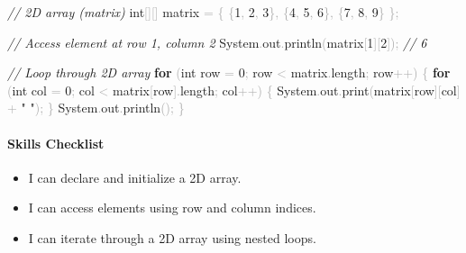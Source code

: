 \documentclass[
  justified,
  openright,
]{tufte-book}
\let\subsection\paragraph
\let\paragraph\paragraph
\newcommand{\KeywordTok}[1]{\textcolor{CodeKeyword}{\textbf{#1}}}  %
\newcommand{\StringTok}[1]{\textcolor{CodeString}{#1}}              %
\newcommand{\CommentTok}[1]{\textcolor{CodeComment}{\textit{#1}}}  %
\newcommand{\CodeNumTok}[1]{\textcolor{CodeNumber}{#1}}             %
\newcommand{\CodeFuncTok}[1]{\textcolor{CodeKeyword}{#1}}           %
\newcommand{\CodeTypeTok}[1]{\textcolor{CodeType}{#1}}              %
\newcommand{\OperatorTok}[1]{\textcolor{DarkGray}{#1}}              %
\newenvironment{Shaded}{%
  \begin{mdframed}[style=TufteCode]%
}{%
  \end{mdframed}%
}
\let\subsection\paragraph
\let\paragraph\paragraph
\providecommand{\tightlist}{%
  \setlength{\itemsep}{0pt}\setlength{\parskip}{0pt}}
\begin{document}
\begin{Shaded}
\begin{Highlighting}[]
\CommentTok{// 2D array (matrix)}
\CodeTypeTok{int}\OperatorTok{[][]} matrix \OperatorTok{=} \OperatorTok{\{}
    \OperatorTok{\{}\CodeNumTok{1}\OperatorTok{,} \CodeNumTok{2}\OperatorTok{,} \CodeNumTok{3}\OperatorTok{\},}
    \OperatorTok{\{}\CodeNumTok{4}\OperatorTok{,} \CodeNumTok{5}\OperatorTok{,} \CodeNumTok{6}\OperatorTok{\},}
    \OperatorTok{\{}\CodeNumTok{7}\OperatorTok{,} \CodeNumTok{8}\OperatorTok{,} \CodeNumTok{9}\OperatorTok{\}}
\OperatorTok{\};}
 
\CommentTok{// Access element at row 1, column 2}
System\OperatorTok{.}\CodeFuncTok{out}\OperatorTok{.}\CodeFuncTok{println}\OperatorTok{(}matrix\OperatorTok{[}\CodeNumTok{1}\OperatorTok{][}\CodeNumTok{2}\OperatorTok{]);}   \CommentTok{// 6}
 
\CommentTok{// Loop through 2D array}
\KeywordTok{for} \OperatorTok{(}\CodeTypeTok{int} row \OperatorTok{=} \CodeNumTok{0}\OperatorTok{;} row \OperatorTok{\textless{}} matrix\OperatorTok{.}\CodeFuncTok{length}\OperatorTok{;} row\OperatorTok{++)} \OperatorTok{\{}
    \KeywordTok{for} \OperatorTok{(}\CodeTypeTok{int} col \OperatorTok{=} \CodeNumTok{0}\OperatorTok{;} col \OperatorTok{\textless{}} matrix\OperatorTok{[}row\OperatorTok{].}\CodeFuncTok{length}\OperatorTok{;} col\OperatorTok{++)} \OperatorTok{\{}
        System\OperatorTok{.}\CodeFuncTok{out}\OperatorTok{.}\CodeFuncTok{print}\OperatorTok{(}matrix\OperatorTok{[}row\OperatorTok{][}col\OperatorTok{]} \OperatorTok{+} \StringTok{" "}\OperatorTok{);}
    \OperatorTok{\}}
    System\OperatorTok{.}\CodeFuncTok{out}\OperatorTok{.}\CodeFuncTok{println}\OperatorTok{();}
\OperatorTok{\}}
\end{Highlighting}
\end{Shaded}

\subsection{Skills Checklist}\label{skills-checklist-79}

\begin{itemize}
\tightlist
\item[$\square$]
  I can declare and initialize a 2D array.
\item[$\square$]
  I can access elements using row and column indices.
\item[$\square$]
  I can iterate through a 2D array using nested loops.
\end{itemize}
\end{document}
